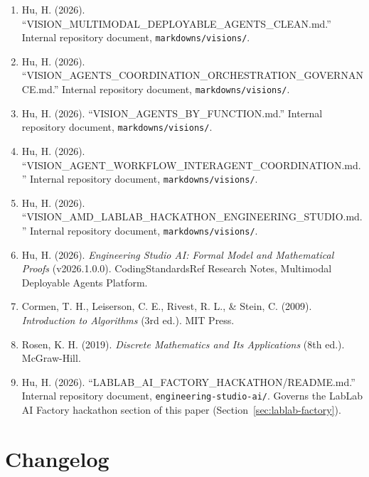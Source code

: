 \documentclass[12pt]{article}
\begin{document}
\begin{sloppypar}
\begin{enumerate}
    \item Hu, H. (2026). ``VISION\_MULTIMODAL\_\allowbreak DEPLOYABLE\_AGENTS\_CLEAN.md.''
          Internal repository document, \texttt{markdowns/visions/}.
    \item Hu, H. (2026). ``VISION\_AGENTS\_COORDINATION\_\allowbreak ORCHESTRATION\_\allowbreak GOVERNANCE.md.'' Internal repository document,
          \texttt{markdowns/visions/}.
    \item Hu, H. (2026). ``VISION\_AGENTS\_BY\_FUNCTION.md.'' Internal
          repository document, \texttt{markdowns/visions/}.
    \item Hu, H. (2026). ``VISION\_AGENT\_WORKFLOW\_INTERAGENT\_\allowbreak COORDINATION.md.'' Internal repository document,
          \texttt{markdowns/visions/}.
    \item Hu, H. (2026). ``VISION\_AMD\_LABLAB\_HACKATHON\_ENGINEERING\_\allowbreak STUDIO.md.'' Internal repository document,
          \texttt{markdowns/visions/}.
    \item Hu, H. (2026). \textit{Engineering Studio AI: Formal Model and
          Mathematical Proofs} (v2026.1.0.0). CodingStandardsRef Research
          Notes, Multimodal Deployable Agents Platform.
    \item Cormen, T. H., Leiserson, C. E., Rivest, R. L., \& Stein, C.
          (2009). \textit{Introduction to Algorithms} (3rd ed.). MIT Press.
    \item Rosen, K. H. (2019). \textit{Discrete Mathematics and Its
          Applications} (8th ed.). McGraw-Hill.
    \item Hu, H. (2026). ``LABLAB\_AI\_FACTORY\_HACKATHON/README.md.''
          Internal repository document,
          \texttt{engineering-studio-ai/}.  Governs the LabLab AI
          Factory hackathon section of this paper
          (Section~\ref{sec:lablab-factory}).
\end{enumerate}
\end{sloppypar}

\newpage
\section*{Changelog}
\label{sec:changelog}
\end{document}
